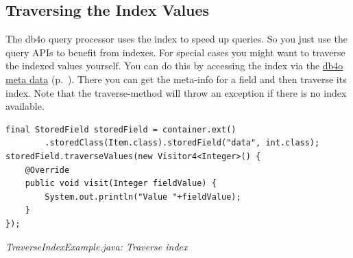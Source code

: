 \subsection{Traversing the Index Values}
\label{ref:basics-indexing-traverse-index}

The db4o query processor uses the index to speed up queries. So you just use the query APIs to benefit from indexes. For special cases you might want to traverse the indexed values yourself. You can do this by accessing the index via the \hyperref[ref:advanced-topics-db4o-meta-information]{db4o meta data} (p.~\pageref{ref:advanced-topics-db4o-meta-information}). There you can get the meta-info for a field and then traverse its index. Note that the traverse-method will throw an exception if there is no index available.

\begin{lstlisting}
final StoredField storedField = container.ext()
        .storedClass(Item.class).storedField("data", int.class);
storedField.traverseValues(new Visitor4<Integer>() {
    @Override
    public void visit(Integer fieldValue) {
        System.out.println("Value "+fieldValue);
    }
});
\end{lstlisting}

{\small\itshape TraverseIndexExample.java: Traverse index\par}
\medskip

